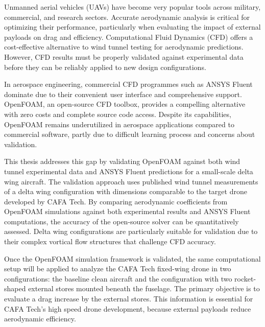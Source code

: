 Unmanned aerial vehicles (UAVs) have become very popular tools across military, commercial, and research sectors.\cite{drones} Accurate aerodynamic analysis is critical for optimizing their performance, particularly when evaluating the impact of external payloads on drag and efficiency. Computational Fluid Dynamics (CFD) offers a cost-effective alternative to wind tunnel testing for aerodynamic predictions. However, CFD results must be properly validated against experimental data before they can be reliably applied to new design configurations.

In aerospace engineering, commercial CFD programmes such as ANSYS Fluent dominate due to their convenient user interface and comprehensive support. OpenFOAM, an open-source CFD toolbox, provides a compelling alternative with zero costs and complete source code access. Despite its capabilities, OpenFOAM remains underutilized in aerospace applications compared to commercial software, partly due to difficult learning process and concerns about validation. 

This thesis addresses this gap by validating OpenFOAM against both wind tunnel experimental data and ANSYS Fluent predictions for a small-scale delta wing aircraft. The validation approach uses published wind tunnel measurements of a delta wing configuration with dimensions comparable to the target drone developed by CAFA Tech. By comparing aerodynamic coefficients from OpenFOAM simulations against both experimental results and ANSYS Fluent computations, the accuracy of the open-source solver can be quantitatively assessed. Delta wing configurations are particularly suitable for validation due to their complex vortical flow structures that challenge CFD accuracy.

Once the OpenFOAM simulation framework is validated, the same computational setup will be applied to analyze the CAFA Tech fixed-wing drone in two configurations: the baseline clean aircraft and the configuration with two rocket-shaped external stores mounted beneath the fuselage. The primary objective is to evaluate a drag increase by the external stores. This information is essential for CAFA Tech's high speed drone development, because external payloads reduce aerodynamic efficiency. 
